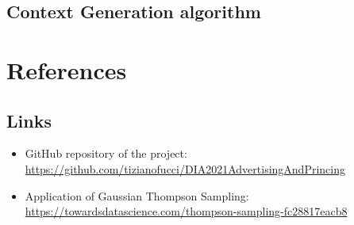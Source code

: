 \documentclass[12pt,a4paper]{report}
\begin{document}
\section{Context Generation algorithm}



	\chapter{References}
		\label{chap:ref}
		\section{Links}

\begin{itemize}
	\item GitHub repository of the project: \url{https://github.com/tizianofucci/DIA2021AdvertisingAndPrincing}
	\item Application of Gaussian Thompson Sampling: \url{https://towardsdatascience.com/thompson-sampling-fc28817eacb8}
\end{itemize}
\end{document}
